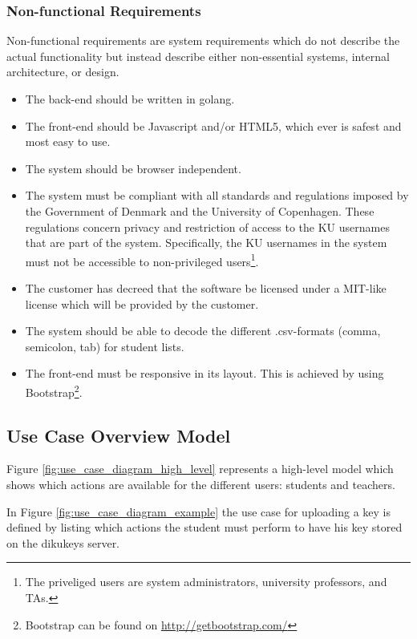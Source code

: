 \documentclass[11pt,a4paper]{report}
\begin{document}
\subsubsection{Non-functional Requirements}\label{subsubsec:Non_Functional_Req}
Non-functional requirements are system requirements which do not describe the actual functionality but instead describe either non-essential systems, internal architecture, or design.
\begin{itemize}
\item The back-end should be written in golang.
\item The front-end should be Javascript and/or HTML5, which ever is safest and most easy to use.
\item The system should be browser independent.
\item The system must be compliant with all standards and regulations imposed by the Government of Denmark and the University of Copenhagen. These regulations concern privacy and restriction of access to the KU usernames that are part of the system. Specifically, the KU usernames in the system must not be accessible to non-privileged users\footnote{The priveliged users are system administrators, university professors, and TAs.}.
\item The customer has decreed that the software be licensed under a MIT-like license which will be provided by the customer.
\item The system should be able to decode the different .csv-formats (comma, semicolon, tab) for student lists.
\item The front-end must be responsive in its layout. This is achieved by using Bootstrap\footnote{Bootstrap can be found on \href{http://getbootstrap.com/}{http://getbootstrap.com/}}.
\end{itemize}

\subsection{Use Case Overview Model}\label{subsec:Use_case_model}

Figure \ref{fig:use_case_diagram_high_level} represents a high-level model which shows which actions are available for the different users: students and teachers.

In Figure \ref{fig:use_case_diagram_example} the use case for uploading a key is defined by listing which actions the student must perform to have his key stored on the dikukeys server.
\end{document}
